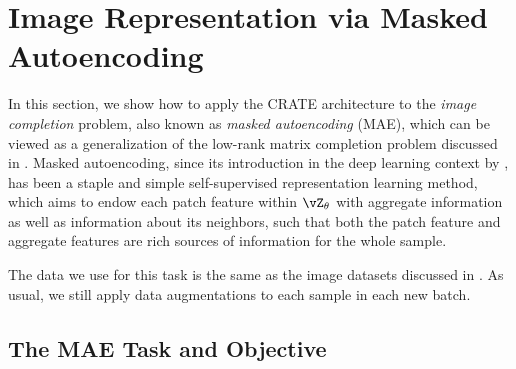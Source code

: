 \documentclass[../../book-main.tex]{subfiles}
\begin{document}
\section{Image Representation via Masked
Autoencoding}\label{sec:image_completion}

In this section, we show how to apply the CRATE architecture to the
\textit{image completion} problem, also known as \textit{masked
autoencoding} (MAE), which can be viewed as a generalization of the
low-rank matrix completion problem discussed in .
Masked autoencoding, since its introduction in the deep learning
context by \cite{he2022masked}, has been a staple and simple
self-supervised representation learning method, which aims to endow
each patch feature within \(\vZ_{\theta}\) with aggregate information
as well as information about its neighbors, such that both the patch
feature and aggregate features are rich sources of information for
the whole sample.

The data we use for this task is the same as the image datasets
discussed in . As usual, we still
apply data augmentations to each sample in each new batch.

\subsection{The MAE Task and Objective}\label{sub:image_completion_objective}
\end{document}

